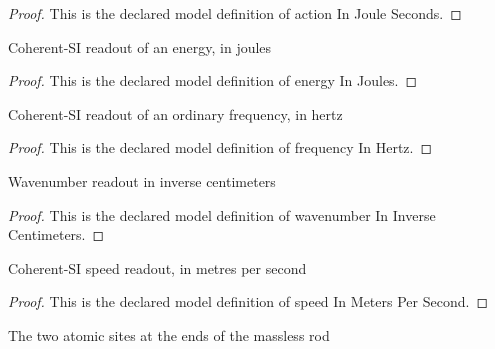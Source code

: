\begin{proof}
  This is the declared model definition of action In Joule Seconds.
\end{proof}
\begin{definition}
  \label{def:physics:phyx-mini-0605:phyxminiproblems-problemphyxmini0605-energyinjoules}
  Coherent-SI readout of an energy, in joules
\end{definition}
\begin{proof}
  This is the declared model definition of energy In Joules.
\end{proof}
\begin{definition}
  \label{def:physics:phyx-mini-0605:phyxminiproblems-problemphyxmini0605-frequencyinhertz}
  Coherent-SI readout of an ordinary frequency, in hertz
\end{definition}
\begin{proof}
  This is the declared model definition of frequency In Hertz.
\end{proof}
\begin{definition}
  \label{def:physics:phyx-mini-0605:phyxminiproblems-problemphyxmini0605-wavenumberininversecentimeters}
  Wavenumber readout in inverse centimeters
\end{definition}
\begin{proof}
  This is the declared model definition of wavenumber In Inverse Centimeters.
\end{proof}
\begin{definition}
  \label{def:physics:phyx-mini-0605:phyxminiproblems-problemphyxmini0605-speedinmeterspersecond}
  Coherent-SI speed readout, in metres per second
\end{definition}
\begin{proof}
  This is the declared model definition of speed In Meters Per Second.
\end{proof}
\begin{definition}
  \label{def:physics:phyx-mini-0605:phyxminiproblems-problemphyxmini0605-atomsite}
  The two atomic sites at the ends of the massless rod
\end{definition}
